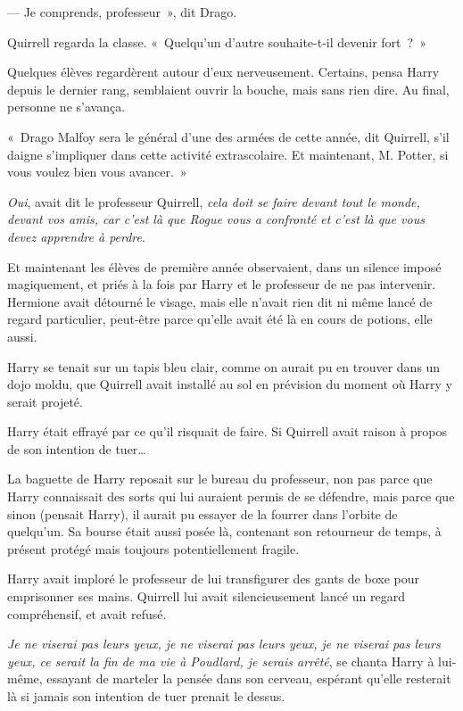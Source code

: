 --- Je comprends, professeur~», dit Drago.

Quirrell regarda la classe.
«~Quelqu'un d'autre souhaite-t-il devenir fort~?~»

Quelques élèves regardèrent autour d'eux nerveusement.
Certains, pensa Harry depuis le dernier rang, semblaient ouvrir la bouche, mais sans rien dire.
Au final, personne ne s'avança.

«~Drago Malfoy sera le général d'une des armées de cette année, dit Quirrell, s'il daigne s'impliquer dans cette activité extrascolaire.
Et maintenant, M. Potter, si vous voulez bien vous avancer.~»

\later

\emph{Oui}, avait dit le professeur Quirrell, \emph{cela doit se faire devant tout le monde, devant vos amis, car c'est là que Rogue vous a confronté et c'est là que vous devez apprendre à perdre}.

Et maintenant les élèves de première année observaient, 
dans un silence imposé magiquement, et priés à la fois par Harry et le professeur de ne pas intervenir.
Hermione avait détourné le visage, mais elle n'avait rien dit ni même lancé de regard particulier, peut-être parce qu'elle avait été là en cours de potions, elle aussi.

Harry se tenait sur un tapis bleu clair, comme on aurait pu en trouver dans un dojo moldu, que Quirrell avait installé au sol en prévision du moment où Harry y serait projeté.

Harry était effrayé par ce qu'il risquait de faire.
Si Quirrell avait raison à propos de son intention de tuer…

La baguette de Harry reposait sur le bureau du professeur, non pas parce que Harry connaissait des sorts qui lui auraient permis de se défendre, mais parce que sinon (pensait Harry), il aurait pu essayer de la fourrer dans l'orbite de quelqu'un.
Sa bourse était aussi posée là, contenant son retourneur de temps, à présent protégé mais toujours potentiellement fragile.

Harry avait imploré le professeur de lui transfigurer des gants de boxe pour emprisonner ses mains.
Quirrell lui avait silencieusement lancé un regard compréhensif, et avait refusé.

\emph{Je ne viserai pas leurs yeux, je ne viserai pas leurs yeux, je ne viserai pas leurs yeux, ce serait la fin de ma vie à Poudlard, je serais arrêté}, se chanta Harry à lui-même, essayant de marteler la pensée dans son cerveau, espérant qu'elle resterait là si jamais son intention de tuer prenait le dessus.

